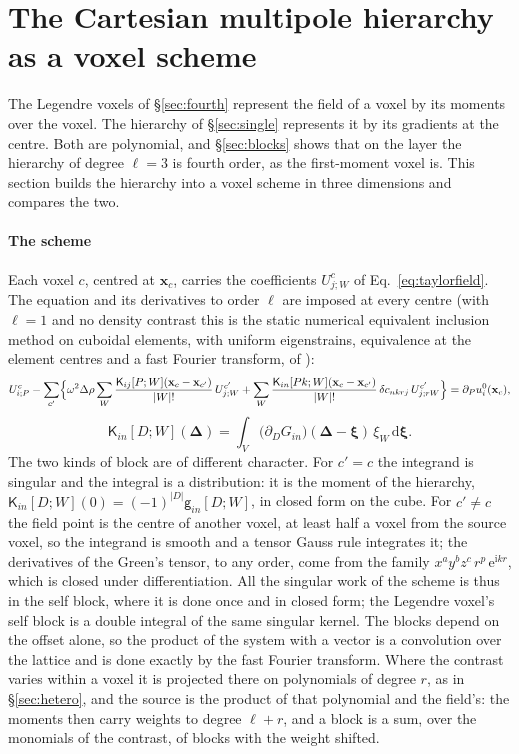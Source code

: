 \documentclass[preprint,review,12pt]{elsarticle}
\newcommand{\dd}{\mathrm{d}}
\begin{document}
\FloatBarrier
\section{The Cartesian multipole hierarchy as a voxel scheme}\label{sec:gradvoxel}

The Legendre voxels of \S\ref{sec:fourth} represent the field of a voxel by its moments over the
voxel. The hierarchy of \S\ref{sec:single} represents it by its gradients at the centre. Both are
polynomial, and \S\ref{sec:blocks} shows that on the layer the hierarchy of degree $\ell=3$ is fourth
order, as the first-moment voxel is. This section builds the hierarchy into a voxel scheme in three
dimensions and compares the two.

\paragraph{The scheme} Each voxel $c$, centred at $\mathbf x_c$, carries the coefficients
$U^c_{j;W}$ of Eq.~\eqref{eq:taylorfield}. The equation and its derivatives to order $\ell$ are imposed
at every centre (with $\ell=1$ and no density contrast this is the static numerical equivalent
inclusion method on cuboidal elements, with uniform eigenstrains, equivalence at the element centres and
a fast Fourier transform, of \citet{Zhou2011}):
\begin{equation}\label{eq:gradlattice}
  U^c_{i;P}-\sum_{c'}\Bigl\{\omega^2\Delta\rho\sum_{W}\frac{\mathsf K_{ij}[P;W](\mathbf x_c-\mathbf x_{c'})}{|W|!}\,U^{c'}_{j;W}
  +\sum_{W}\frac{\mathsf K_{in}[Pk;W](\mathbf x_c-\mathbf x_{c'})}{|W|!}\,\delta c_{nkrj}\,U^{c'}_{j;rW}\Bigr\}
  =\partial_Pu^0_i(\mathbf x_c),
\end{equation}
\begin{equation}\label{eq:gradkernel}
  \mathsf K_{in}[D;W](\boldsymbol\Delta)=\int_{V}\bigl(\partial_DG_{in}\bigr)(\boldsymbol\Delta-\boldsymbol\xi)\,
  \xi_W\,\dd\boldsymbol\xi .
\end{equation}
The two kinds of block are of different character. For $c'=c$ the integrand is singular and the
integral is a distribution: it is the moment of the hierarchy,
$\mathsf K_{in}[D;W](0)=(-1)^{|D|}\mathsf g_{in}[D;W]$, in closed form on the cube. For $c'\neq c$ the
field point is the centre of another voxel, at least half a voxel from the source voxel, so the
integrand is smooth and a tensor Gauss rule integrates it; the derivatives of the Green's tensor, to
any order, come from the family $x^ay^bz^c\,r^p\,\mathrm{e}^{\mathrm{i}kr}$, which is closed under
differentiation. All the singular work of the scheme is thus in the self block, where it is done once
and in closed form; the Legendre voxel's self block is a double integral of the same singular kernel.
The blocks depend on the offset alone, so the product of the system with a vector is a convolution over
the lattice and is done exactly by the fast Fourier transform. Where the contrast varies within a voxel
it is projected there on polynomials of degree $r$, as in \S\ref{sec:hetero}, and the source is the
product of that polynomial and the field's: the moments then carry weights to degree $\ell+r$, and a
block is a sum, over the monomials of the contrast, of blocks with the weight shifted.
\end{document}
